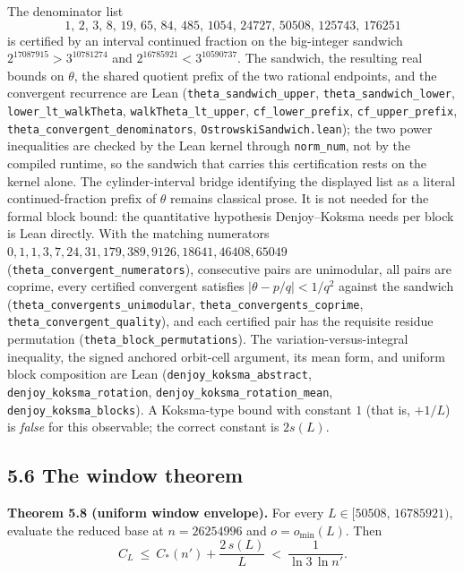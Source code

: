 \documentclass[12pt]{article}
\begin{document}
The denominator list \[
1,\,2,\,3,\,8,\,19,\,65,\,84,\,485,\,1054,\,24727,\,50508,\,
125743,\,176251
\] is certified by an interval continued fraction on the big-integer
sandwich \(2^{17087915}>3^{10781274}\) and
\(2^{16785921}<3^{10590737}\). The sandwich, the resulting real bounds
on \(\theta\), the shared quotient prefix of the two rational endpoints,
and the convergent recurrence are Lean
(\texttt{\nolinkurl{theta_sandwich_upper}},
\texttt{\nolinkurl{theta_sandwich_lower}},
\texttt{\nolinkurl{lower_lt_walkTheta}},
\texttt{\nolinkurl{walkTheta_lt_upper}},
\texttt{\nolinkurl{cf_lower_prefix}},
\texttt{\nolinkurl{cf_upper_prefix}},
\texttt{\nolinkurl{theta_convergent_denominators}},
\texttt{\nolinkurl{OstrowskiSandwich.lean}}); the two power inequalities
are checked by the Lean kernel through \texttt{\nolinkurl{norm_num}},
not by the compiled runtime, so the sandwich that carries this
certification rests on the kernel alone. The cylinder-interval bridge
identifying the displayed list as a literal continued-fraction prefix of
\(\theta\) remains classical prose. It is not needed for the formal
block bound: the quantitative hypothesis Denjoy--Koksma needs per block
is Lean directly. With the matching numerators
\(0,1,1,3,7,24,31,179,389,9126,18641,
46408,65049\) (\texttt{\nolinkurl{theta_convergent_numerators}}),
consecutive pairs are unimodular, all pairs are coprime, every certified
convergent satisfies \(|\theta-p/q|<1/q^2\) against the sandwich
(\texttt{\nolinkurl{theta_convergents_unimodular}},
\texttt{\nolinkurl{theta_convergents_coprime}},
\texttt{\nolinkurl{theta_convergent_quality}}), and each certified pair
has the requisite residue permutation
(\texttt{\nolinkurl{theta_block_permutations}}). The
variation-versus-integral inequality, the signed anchored orbit-cell
argument, its mean form, and uniform block composition are Lean
(\texttt{\nolinkurl{denjoy_koksma_abstract}},
\texttt{\nolinkurl{denjoy_koksma_rotation}},
\texttt{\nolinkurl{denjoy_koksma_rotation_mean}},
\texttt{\nolinkurl{denjoy_koksma_blocks}}). A Koksma-type bound with
constant \(1\) (that is, \(+1/L\)) is \emph{false} for this observable;
the correct constant is \(2s(L)\).

\subsection{5.6 The window theorem}\label{the-window-theorem}

\textbf{Theorem 5.8 (uniform window envelope).} For every
\(L\in[50508,\,16785921)\), evaluate the reduced base at \(n=26254996\)
and \(o=o_{\min}(L)\). Then \[
C_L\ \le\ C_*(n')+\frac{2\,s(L)}{L}\ <\ \frac1{\ln 3\,\ln n'}.
\]
\end{document}
